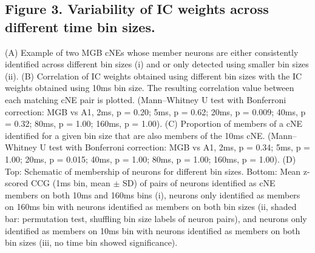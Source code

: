 \documentclass[11pt]{article}
\begin{document}
\subsection*{Figure 3. Variability of IC weights across different time bin sizes.}
(A) Example of two MGB cNEs whose member neurons are either consistently identified across different bin sizes (i) and or only detected using smaller bin sizes (ii). 
(B) Correlation of IC weights obtained using different bin sizes with the IC weights obtained using 10ms bin size. The resulting correlation value between each matching cNE pair is plotted. (Mann–Whitney U test with Bonferroni correction: MGB vs A1, 2ms, p = 0.20; 5ms, p = 0.62; 20ms, p = 0.009; 40ms, p = 0.32; 80ms, p = 1.00; 160ms, p = 1.00).
(C) Proportion of members of a cNE identified for a given bin size that are also members of the 10ms cNE. (Mann–Whitney U test with Bonferroni correction: MGB vs A1, 2ms, p = 0.34; 5ms, p = 1.00; 20ms, p = 0.015; 40ms, p = 1.00; 80ms, p = 1.00; 160ms, p = 1.00).
(D) Top: Schematic of membership of neurons for different bin sizes. Bottom: Mean z-scored CCG (1ms bin, mean $\pm$ SD) of pairs of neurons identified as cNE members on both 10ms and 160ms bins (i), neurons only identified as members on 160ms bin with neurons identified as members on both bin sizes (ii, shaded bar: permutation test, shuffling bin size labels of neuron pairs), and neurons only identified as members on 10ms bin with neurons identified as members on both bin sizes (iii, no time bin showed significance).
\end{document}

